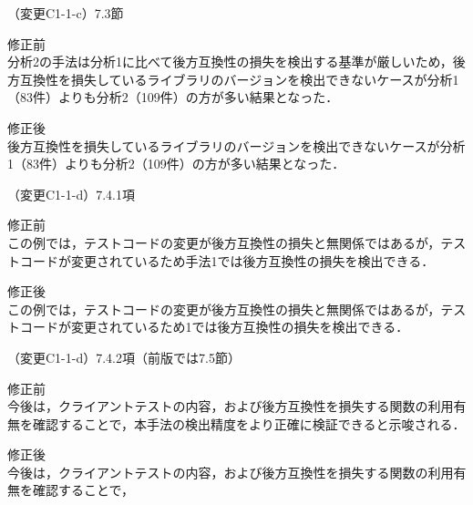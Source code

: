 \documentclass{jarticle} %
\def\subsection#1{ \vspace{1pc} {\gt #1} }
\begin{document}
\subsection{（変更C1-1-c）7.3節}
\vspace{-0.3cm}
\begin{description}
\item 修正前\\
\phantom{　}
分析2の手法は分析1に比べて後方互換性の損失を検出する基準が厳しいため，後方互換性を損失しているライブラリのバージョンを検出できないケースが分析1（83件）よりも分析2（109件）の方が多い結果となった．
\vspace{-0.3cm}
\item 修正後\\
\phantom{　}
\textcolor{red}{}後方互換性を損失しているライブラリのバージョンを検出できないケースが分析1（83件）よりも分析2（109件）の方が多い結果となった．
\end{description}

\subsection{（変更C1-1-d）7.4.1項}
\vspace{-0.3cm}
\begin{description}
\item 修正前\\
\phantom{　}
この例では，テストコードの変更が後方互換性の損失と無関係ではあるが，テストコードが変更されているため手法1では後方互換性の損失を検出できる．
\vspace{-0.3cm}
\item 修正後\\
\phantom{　}
この例では，テストコードの変更が後方互換性の損失と無関係ではあるが，テストコードが変更されているため\textcolor{red}{}1では後方互換性の損失を検出できる．
\end{description}

\subsection{（変更C1-1-d）7.4.2項（前版では7.5節）}
\vspace{-0.3cm}
\begin{description}
\item 修正前\\
\phantom{　}
今後は，クライアントテストの内容，および後方互換性を損失する関数の利用有無を確認することで，本手法の検出精度をより正確に検証できると示唆される．
\vspace{-0.3cm}
\item 修正後\\
\phantom{　}
今後は，クライアントテストの内容，および後方互換性を損失する関数の利用有無を確認することで，\textcolor{red}{}
\end{description}
\end{document}
